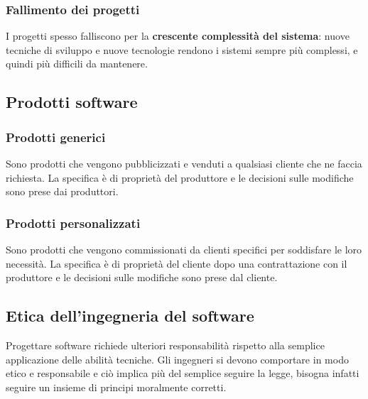 \documentclass[a4paper]{article}
\begin{document}
\subsubsection{Fallimento dei progetti}
I progetti spesso falliscono per la \textbf{crescente complessità del sistema}: nuove 
tecniche di sviluppo e nuove tecnologie rendono i sistemi sempre più complessi, e quindi 
più difficili da mantenere.

\subsection{Prodotti software}
\subsubsection{Prodotti generici}
Sono prodotti che vengono pubblicizzati e venduti a qualsiasi cliente che ne faccia 
richiesta. La specifica è di proprietà del produttore e le decisioni sulle modifiche
sono prese dai produttori.

\subsubsection{Prodotti personalizzati}
Sono prodotti che vengono commissionati da clienti specifici per soddisfare le loro
necessità. La specifica è di proprietà del cliente dopo una contrattazione con il
produttore e le decisioni sulle modifiche sono prese dal cliente.

\subsection{Etica dell'ingegneria del software}
Progettare software richiede ulteriori responsabilità rispetto alla semplice applicazione
delle abilità tecniche. Gli ingegneri si devono comportare in modo etico e responsabile
e ciò implica più del semplice seguire la legge, bisogna infatti seguire un insieme di
principi moralmente corretti.
\end{document}
